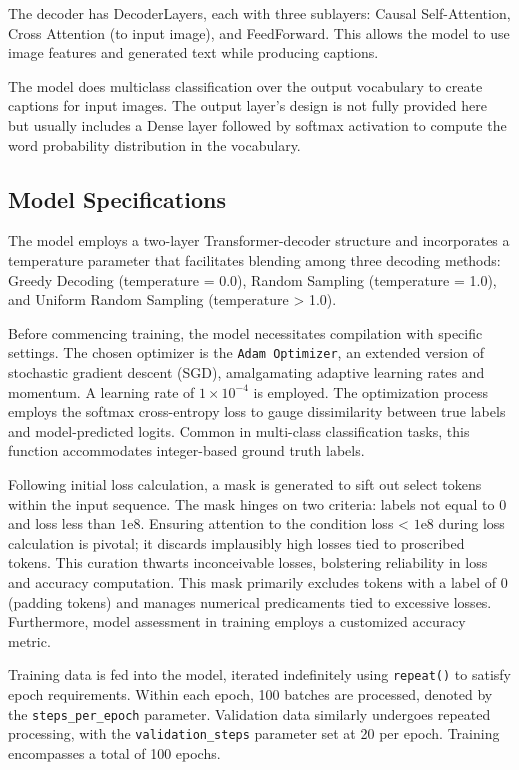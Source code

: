 \documentclass[runningheads]{llncs}
\begin{document}
The decoder has DecoderLayers, each with three sublayers: Causal Self-Attention, Cross Attention (to input image), and FeedForward. This allows the model to use image features and generated text while producing captions.

The model does multiclass classification over the output vocabulary to create captions for input images. The output layer's design is not fully provided here but usually includes a Dense layer followed by softmax activation to compute the word probability distribution in the vocabulary.

\subsection{Model Specifications}

The model employs a two-layer Transformer-decoder structure and incorporates a temperature parameter that facilitates blending among three decoding methods: Greedy Decoding (temperature = 0.0), Random Sampling (temperature = 1.0), and Uniform Random Sampling (temperature > 1.0).

Before commencing training, the model necessitates compilation with specific settings. The chosen optimizer is the \texttt{Adam Optimizer}, an extended version of stochastic gradient descent (SGD), amalgamating adaptive learning rates and momentum. A learning rate of $1 \times 10^{-4}$ is employed. The optimization process employs the softmax cross-entropy loss to gauge dissimilarity between true labels and model-predicted logits. Common in multi-class classification tasks, this function accommodates integer-based ground truth labels.

Following initial loss calculation, a mask is generated to sift out select tokens within the input sequence. The mask hinges on two criteria: labels not equal to 0 and loss less than $1 \mathrm{e} 8$. Ensuring attention to the condition loss < $1 \mathrm{e} 8$ during loss calculation is pivotal; it discards implausibly high losses tied to proscribed tokens. This curation thwarts inconceivable losses, bolstering reliability in loss and accuracy computation. This mask primarily excludes tokens with a label of 0 (padding tokens) and manages numerical predicaments tied to excessive losses. Furthermore, model assessment in training employs a customized accuracy metric.

Training data is fed into the model, iterated indefinitely using \texttt{repeat()} to satisfy epoch requirements. Within each epoch, 100 batches are processed, denoted by the \texttt{steps\_per\_epoch} parameter. Validation data similarly undergoes repeated processing, with the \texttt{validation\_steps} parameter set at 20 per epoch. Training encompasses a total of 100 epochs.
\end{document}
